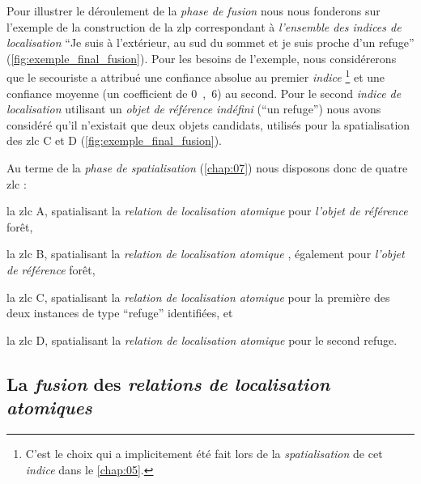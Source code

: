 Pour illustrer le déroulement de la \emph{phase de fusion} nous nous
fonderons sur l'exemple de la construction de la \ac{zlp}
correspondant à \emph{l'ensemble des indices de localisation}
\enquote{Je suis à l'extérieur, au sud du sommet et je suis proche
  d'un refuge} (\autoref{fig:exemple_final_fusion}). Pour les besoins
de l'exemple, nous considérerons que le secouriste a attribué une
confiance absolue au premier \emph{indice} \footnote{C'est le choix
  qui a implicitement été fait lors de la \emph{spatialisation} de cet
  \emph{indice} dans le \autoref{chap:05}.} et une confiance moyenne
(\ie un coefficient de \si{0,6}) au second. Pour le second
\emph{indice de localisation} utilisant un \emph{objet de référence
  indéfini} (\eg \enquote{un refuge}) nous avons considéré qu'il
n'existait que deux objets candidats, utilisés pour la spatialisation
des \ac{zlc} \textcolor{RdBu-9-8}{\textsf{C}} et
\textcolor{RdBu-9-9}{\textsf{D}} (\autoref{fig:exemple_final_fusion}).

Au terme de la \emph{phase de spatialisation} (\autoref{chap:07}) nous
disposons donc de quatre \ac{zlc} :
% 
\begin{enumerate*}[label=(\arabic*)]
\item la \ac{zlc} \textcolor{RdBu-9-1}{\textsf{A}}, spatialisant la
  \emph{relation de localisation atomique}  pour
  \emph{l'objet de référence} forêt,
\item la \ac{zlc} \textcolor{RdBu-9-2}{\textsf{B}}, spatialisant la
  \emph{relation de localisation atomique} ,
  également pour \emph{l'objet de référence} forêt,
\item la \ac{zlc} \textcolor{RdBu-9-8}{\textsf{C}}, spatialisant la
  \emph{relation de localisation atomique}  pour
  la première des deux instances de type \enquote{refuge} identifiées,
  et
\item la \ac{zlc} \textcolor{RdBu-9-9}{\textsf{D}}, spatialisant la
  \emph{relation de localisation atomique}  pour
  le second refuge.
\end{enumerate*}

\subsection{La \emph{fusion} des \emph{relations de localisation
    atomiques}}

